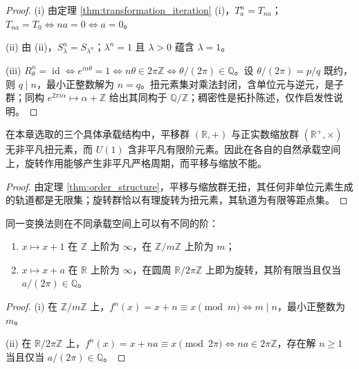 \begin{proof}
(i) 由定理 \ref{thm:transformation_iteration} (i)，$T_a^n=T_{na}$；$T_{na}=T_0\iff na=0\iff a=0$。

(ii) 由 (ii)，$S_\lambda^n=S_{\lambda^n}$；$\lambda^n=1$ 且 $\lambda>0$ 蕴含 $\lambda=1$。

(iii) $R_\theta^n=\operatorname{id}\iff e^{in\theta}=1\iff n\theta\in 2\pi\mathbb{Z}\iff \theta/(2\pi)\in\mathbb{Q}$。设 $\theta/(2\pi)=p/q$ 既约，则 $q\mid n$，最小正整数解为 $n=q$。扭元素集对乘法封闭，含单位元与逆元，是子群；同构 $e^{2\pi i\alpha}\mapsto \alpha+\mathbb{Z}$ 给出其同构于 $\mathbb{Q}/\mathbb{Z}$；稠密性是拓扑陈述，仅作启发性说明。
\end{proof}

\begin{corollary}[三种承载结构的扭元素分布]\label{cor:rotation_unique}
在本章选取的三个具体承载结构中，平移群 $(\mathbb{R},+)$ 与正实数缩放群 $(\mathbb{R}^+,\times)$ 无非平凡扭元素，而 $U(1)$ 含非平凡有限阶元素。因此在各自的自然承载空间上，旋转作用能够产生非平凡严格周期，而平移与缩放不能。
\end{corollary}

\begin{proof}
由定理 \ref{thm:order_structure}，平移与缩放群无扭，其任何非单位元素生成的轨道都是无限集；旋转群恰以有理旋转为扭元素，其轨道为有限等距点集。
\end{proof}

\begin{proposition}[周期性是变换与承载空间的联合性质]\label{prop:carrier_space}
同一变换法则在不同承载空间上可以有不同的阶：
\begin{enumerate}[label=(\roman*)]
    \item $x\mapsto x+1$ 在 $\mathbb{Z}$ 上阶为 $\infty$，在 $\mathbb{Z}/m\mathbb{Z}$ 上阶为 $m$；
    \item $x\mapsto x+a$ 在 $\mathbb{R}$ 上阶为 $\infty$，在圆周 $\mathbb{R}/2\pi\mathbb{Z}$ 上即为旋转，其阶有限当且仅当 $a/(2\pi)\in\mathbb{Q}$。
\end{enumerate}
\end{proposition}

\begin{proof}
(i) 在 $\mathbb{Z}/m\mathbb{Z}$ 上，$f^n(x)=x+n\equiv x\pmod m\iff m\mid n$，最小正整数为 $m$。

(ii) 在 $\mathbb{R}/2\pi\mathbb{Z}$ 上，$f^n(x)=x+na\equiv x\pmod{2\pi}\iff na\in 2\pi\mathbb{Z}$，存在解 $n\ge 1$ 当且仅当 $a/(2\pi)\in\mathbb{Q}$。
\end{proof}


